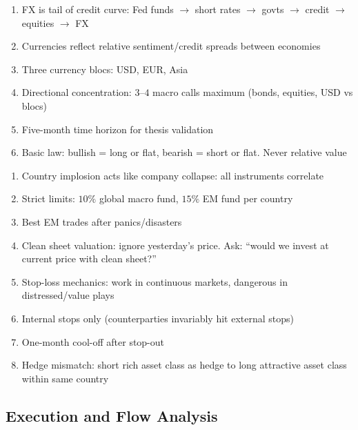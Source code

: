 \documentclass[a4paper,oneside,openany]{book}
\begin{document}
\begin{remark} 
\begin{enumerate}[label=\roman*.]
\setlength{\itemsep}{0pt}
\item FX is tail of credit curve: Fed funds $\rightarrow$ short rates $\rightarrow$ govts $\rightarrow$ credit $\rightarrow$ equities $\rightarrow$ FX
\item Currencies reflect relative sentiment/credit spreads between economies
\item Three currency blocs: USD, EUR, Asia
\item Directional concentration: $3$--$4$ macro calls maximum (bonds, equities, USD vs blocs)
\item Five-month time horizon for thesis validation
\item Basic law: bullish = long or flat, bearish = short or flat. Never relative value
\end{enumerate}
\end{remark}

\begin{remark} 
\begin{enumerate}[label=\roman*.]
\setlength{\itemsep}{0pt}
\item Country implosion acts like company collapse: all instruments correlate
\item Strict limits: $10\%$ global macro fund, $15\%$ EM fund per country
\item Best EM trades after panics/disasters
\item Clean sheet valuation: ignore yesterday's price. Ask: ``would we invest at current price with clean sheet?''
\item Stop-loss mechanics: work in continuous markets, dangerous in distressed/value plays
\item Internal stops only (counterparties invariably hit external stops)
\item One-month cool-off after stop-out
\item Hedge mismatch: short rich asset class as hedge to long attractive asset class within same country
\end{enumerate}
\end{remark}

\subsection*{Execution and Flow Analysis}
\end{document}
